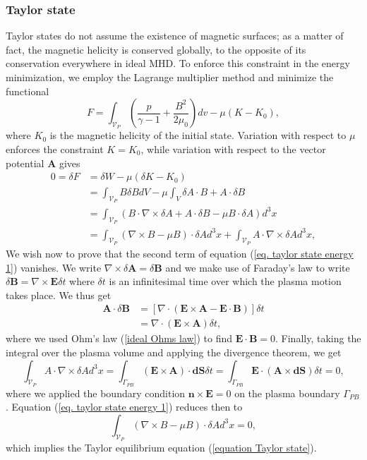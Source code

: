 \documentclass[my_thesis.tex]{subfiles}
\begin{document}
\subsubsection{Taylor state}
Taylor states do not assume the existence of magnetic surfaces; as a matter of fact, the magnetic helicity is conserved globally, to the opposite of its conservation everywhere in ideal MHD. To enforce this constraint in the energy minimization, we employ the Lagrange multiplier method and minimize the functional
\begin{equation}
	F = \int_{\mathcal{V}_P} \left(\frac{p}{\gamma-1}+\frac{B^2}{2\mu_0}\right)dv - \mu(K-K_0),
\end{equation}
where $K_0$ is the magnetic helicity of the initial state. Variation with respect to $\mu$ enforces the constraint $K=K_0$, while variation with respect to the vector potential $\mathbf{A}$ gives
\begin{align}
	0 = \delta F &= \delta W - \mu(\delta K - K_0)\\
	&= \int_{\mathcal{V}_P} B\delta B dV - \mu \int_V \delta A \cdot B + A \cdot \delta B\\
	&=\int_{\mathcal{V}_P} \left(B \cdot \nabla \times \delta A + A\cdot \delta B - \mu B \cdot \delta A\right) d^3x\\
	&=\int_{\mathcal{V}_P} \left( \nabla \times B - \mu B \right) \cdot \delta Ad^3x + \int_{\mathcal{V}_P}A \cdot \nabla \times \delta A d^3x, \label{eq. taylor state energy 1}
\end{align}
We wish now to prove that the second term of equation (\ref{eq. taylor state energy 1}) vanishes. We write $\nabla\times\delta\mathbf{A}=\delta\mathbf{B}$ and we make use of Faraday's law to write $\delta\mathbf{B} = \nabla\times\mathbf{E}\delta t$ where $\delta t$ is an infinitesimal time over which the plasma motion takes place. We thus get
\begin{align}
	\mathbf{A}\cdot\delta\mathbf{B}&=\left[\nabla\cdot(\mathbf{E}\times\mathbf{A}-\mathbf{E}\cdot\mathbf{B})\right]\delta t\\
	&= \nabla\cdot(\mathbf{E}\times\mathbf{A})\delta t,
\end{align}
where we used Ohm's law (\ref{ideal Ohms law}) to find $\mathbf{E}\cdot\mathbf{B}=0$. Finally, taking the integral over the plasma volume and applying the divergence theorem, we get
\begin{equation}
	\int_{\mathcal{V}_P}A \cdot \nabla \times \delta A d^3x = \int_{\Gamma_{PB}}  (\mathbf{E}\times\mathbf{A})\cdot\mathbf{dS}\delta t = \int_{\Gamma_{PB}}  \mathbf{E}\cdot(\mathbf{A}\times\mathbf{dS})\delta t = 0,
\end{equation}
where we applied the boundary condition $\mathbf{n}\times\mathbf{E}=0$ on the plasma boundary $\Gamma_{PB}$. Equation (\ref{eq. taylor state energy 1}) reduces then to
\begin{equation}
	\int_{\mathcal{V}_P} \left( \nabla \times B - \mu B \right) \cdot \delta Ad^3x = 0,
\end{equation}
which implies the Taylor equilibrium equation (\ref{equation Taylor state}).
\end{document}

